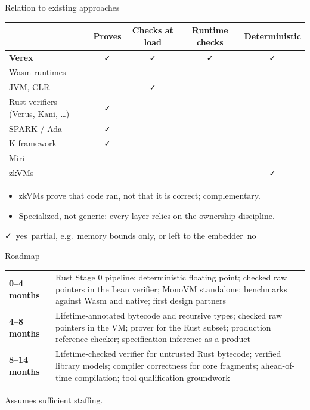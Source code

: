 \documentclass[aspectratio=169,11pt]{beamer}
\newcommand{\yes}{\textcolor{mBlue}{\faCheck}}
\newcommand{\no}{\textcolor{black!45}{\faTimes}}
\newcommand{\partly}{\textcolor{mRust}{\faAdjust}}
\begin{document}
\begin{frame}{Relation to existing approaches}
  \small
  \renewcommand{\arraystretch}{1.2}
  \begin{tabular}{@{}P{0.34\textwidth}cccc@{}}
    & \textbf{Proves} & \textbf{Checks at load} & \textbf{Runtime checks} & \textbf{Deterministic} \\
    \hline
    \textbf{Verex} & \yes & \yes & \yes & \yes \\
    Wasm runtimes & \no & \partly & \partly & \partly \\
    JVM, CLR & \no & \yes & \partly & \no \\
    Rust verifiers (Verus, Kani, \ldots) & \yes & \no & \no & \no \\
    SPARK / Ada & \yes & \no & \partly & \no \\
    K framework & \yes & \no & \partly & \partly \\
    Miri & \no & \no & \partly & \no \\
    zkVMs & \no & \no & \no & \yes \\
  \end{tabular}
  \par\medskip
  \begin{itemize}\setlength{\itemsep}{2pt}
    \item zkVMs prove that code ran, not that it is correct; complementary.
    \item Specialized, not generic: every layer relies on the ownership discipline.
  \end{itemize}
  \par
  {\footnotesize \yes\ yes\quad \partly\ partial, e.g.\ memory bounds only, or left to the embedder\quad \no\ no}
\end{frame}

\begin{frame}{Roadmap}
  \renewcommand{\arraystretch}{1.3}
  \begin{tabular}{@{}P{0.16\textwidth}P{0.78\textwidth}@{}}
    \textbf{0--4 months} & Rust Stage 0 pipeline; deterministic floating point; checked raw pointers in the Lean verifier; MonoVM standalone; benchmarks against Wasm and native; first design partners \\
    \textbf{4--8 months} & Lifetime-annotated bytecode and recursive types; checked raw pointers in the VM; prover for the Rust subset; production reference checker; specification inference as a product \\
    \textbf{8--14 months} & Lifetime-checked verifier for untrusted Rust bytecode; verified library models; compiler correctness for core fragments; ahead-of-time compilation; tool qualification groundwork \\
  \end{tabular}
  \par\medskip
  {\small Assumes sufficient staffing.}
\end{frame}
\end{document}
